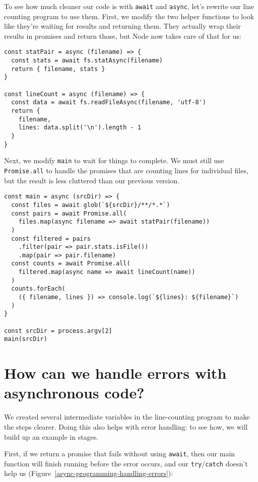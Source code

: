 \documentclass[krantzl]{krantz}
\newcommand{\figref}[1]{Figure~\ref{#1}}
\begin{document}
To see how much cleaner our code is with \texttt{await} and \texttt{async},
let's rewrite our line counting program to use them.
First,
we modify the two helper functions to look like they're waiting for results and returning them.
They actually wrap their results in promises and return those,
but Node now takes care of that for us:


\begin{lstlisting}[frame=single,frameround=tttt]
const statPair = async (filename) => {
  const stats = await fs.statAsync(filename)
  return { filename, stats }
}

const lineCount = async (filename) => {
  const data = await fs.readFileAsync(filename, 'utf-8')
  return {
    filename,
    lines: data.split('\n').length - 1
  }
}
\end{lstlisting}



Next,
we modify \texttt{main} to wait for things to complete.
We must still use \texttt{Promise.all} to handle the promises
that are counting lines for individual files,
but the result is less cluttered than our previous version.


\begin{lstlisting}[frame=single,frameround=tttt]
const main = async (srcDir) => {
  const files = await glob(`${srcDir}/**/*.*`)
  const pairs = await Promise.all(
    files.map(async filename => await statPair(filename))
  )
  const filtered = pairs
    .filter(pair => pair.stats.isFile())
    .map(pair => pair.filename)
  const counts = await Promise.all(
    filtered.map(async name => await lineCount(name))
  )
  counts.forEach(
    ({ filename, lines }) => console.log(`${lines}: ${filename}`)
  )
}

const srcDir = process.argv[2]
main(srcDir)
\end{lstlisting}


\section{How can we handle errors with asynchronous code?}\label{async-programming-errors}


We created several intermediate variables in the line-counting program to make the steps clearer.
Doing this also helps with error handling:
to see how,
we will build up an example in stages.


First,
if we return a promise that fails without using \texttt{await},
then our main function will finish running before the error occurs,
and our \texttt{try}/\texttt{catch} doesn't help us
(\figref{async-programming-handling-errors}):
\end{document}
